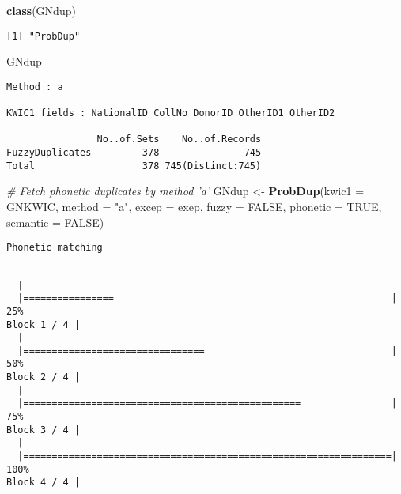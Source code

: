 \documentclass[]{article}
\newenvironment{Shaded}{\begin{snugshade}}{\end{snugshade}}
\newcommand{\CommentTok}[1]{\textcolor[rgb]{0.56,0.35,0.01}{\textit{#1}}}
\newcommand{\DataTypeTok}[1]{\textcolor[rgb]{0.13,0.29,0.53}{#1}}
\newcommand{\KeywordTok}[1]{\textcolor[rgb]{0.13,0.29,0.53}{\textbf{#1}}}
\newcommand{\NormalTok}[1]{#1}
\newcommand{\OtherTok}[1]{\textcolor[rgb]{0.56,0.35,0.01}{#1}}
\newcommand{\StringTok}[1]{\textcolor[rgb]{0.31,0.60,0.02}{#1}}
\begin{document}
\begin{Shaded}
\begin{Highlighting}[]
\KeywordTok{class}\NormalTok{(GNdup)}
\end{Highlighting}
\end{Shaded}

\begin{verbatim}
[1] "ProbDup"
\end{verbatim}

\begin{Shaded}
\begin{Highlighting}[]
\NormalTok{GNdup}
\end{Highlighting}
\end{Shaded}

\begin{verbatim}
Method : a

KWIC1 fields : NationalID CollNo DonorID OtherID1 OtherID2
 
                No..of.Sets    No..of.Records
FuzzyDuplicates         378               745
Total                   378 745(Distinct:745)
\end{verbatim}

\begin{Shaded}
\begin{Highlighting}[]
\CommentTok{# Fetch phonetic duplicates by method 'a'}
\NormalTok{GNdup <-}\StringTok{ }\KeywordTok{ProbDup}\NormalTok{(}\DataTypeTok{kwic1 =}\NormalTok{ GNKWIC, }\DataTypeTok{method =} \StringTok{"a"}\NormalTok{, }\DataTypeTok{excep =}\NormalTok{ exep, }\DataTypeTok{fuzzy =} \OtherTok{FALSE}\NormalTok{,}
                 \DataTypeTok{phonetic =} \OtherTok{TRUE}\NormalTok{, }\DataTypeTok{semantic =} \OtherTok{FALSE}\NormalTok{)}
\end{Highlighting}
\end{Shaded}

\begin{verbatim}
Phonetic matching
\end{verbatim}

\begin{verbatim}

  |                                                                       
  |================                                                 |  25%
Block 1 / 4 |
  |                                                                       
  |================================                                 |  50%
Block 2 / 4 |
  |                                                                       
  |=================================================                |  75%
Block 3 / 4 |
  |                                                                       
  |=================================================================| 100%
Block 4 / 4 |
\end{verbatim}
\end{document}
